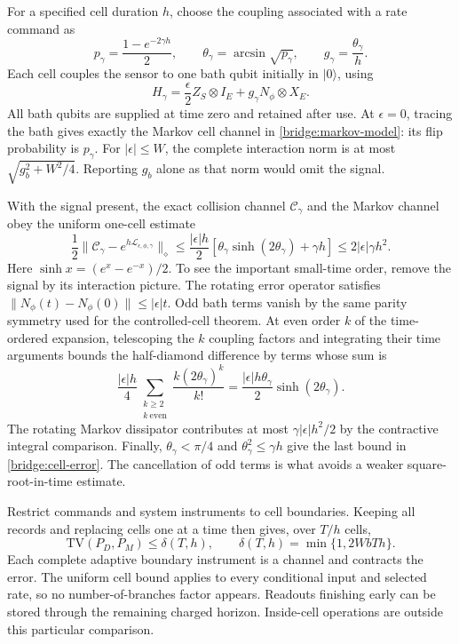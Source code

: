 \documentclass[11pt,a4paper]{article}
\numberwithin{equation}{section}
\theoremstyle{remark}
\begin{document}
For a specified cell duration $h$, choose the coupling associated with a
rate command as
\begin{equation}
 p_\gamma=\frac{1-e^{-2\gamma h}}2,
 \qquad \theta_\gamma=\arcsin\sqrt{p_\gamma},
 \qquad g_\gamma=\frac{\theta_\gamma}{h}.
\end{equation}
Each cell couples the sensor to one bath qubit initially in $|0\rangle$,
using
\begin{equation}
 H_\gamma=\frac\epsilon2 Z_S\otimes I_E+
 g_\gamma N_\phi\otimes X_E.
\end{equation}
All bath qubits are supplied at time zero and retained after use. At
$\epsilon=0$, tracing the bath gives exactly the Markov cell channel in
\eqref{bridge:markov-model}: its flip probability is $p_\gamma$.
For $|\epsilon|\le W$, the complete interaction norm is at most
$\sqrt{g_b^2+W^2/4}$. Reporting $g_b$ alone as that norm would omit the signal.

With the signal present, the exact collision channel $\mathcal C_\gamma$
and the Markov channel obey the uniform one-cell estimate
\begin{equation}
 \frac12\|\mathcal C_\gamma-e^{h\mathcal L_{\epsilon,\phi,\gamma}}
 \|_\diamond
 \le\frac{|\epsilon|h}{2}
 [\theta_\gamma\sinh(2\theta_\gamma)+\gamma h]
 \le 2|\epsilon|\gamma h^2.
 \label{bridge:cell-error}
\end{equation}
Here $\sinh x=(e^x-e^{-x})/2$. To see the important small-time order,
remove the signal by its interaction picture. The rotating error operator
satisfies $\|N_\phi(t)-N_\phi(0)\|\le|\epsilon|t$. Odd bath terms vanish
by the same parity symmetry used for the controlled-cell theorem. At even
order $k$ of the time-ordered expansion, telescoping the $k$ coupling
factors and integrating their
time arguments bounds the half-diamond difference by terms whose sum is
\begin{equation}
 \frac{|\epsilon|h}{4}
 \sum_{\substack{k\ge2\\k\ \mathrm{even}}}
 \frac{k(2\theta_\gamma)^k}{k!}
 =\frac{|\epsilon|h\theta_\gamma}{2}\sinh(2\theta_\gamma).
\end{equation}
The rotating Markov dissipator contributes at most
$\gamma|\epsilon|h^2/2$ by the contractive integral comparison.
Finally, $\theta_\gamma<\pi/4$ and
$\theta_\gamma^2\le\gamma h$ give the last bound in
\eqref{bridge:cell-error}. The cancellation of odd terms is what avoids
a weaker square-root-in-time estimate.

Restrict commands and system instruments to cell boundaries. Keeping all
records and replacing cells one at a time then gives, over $T/h$ cells,
\begin{equation}
 \mathrm{TV}(P_D,P_M)\le\delta(T,h),
 \qquad \delta(T,h)=\min\{1,2WbTh\}.
 \label{bridge:record-error}
\end{equation}
Each complete adaptive boundary instrument is a channel and contracts the
error. The uniform cell bound applies to every conditional input and
selected rate, so no number-of-branches factor appears. Readouts finishing
early can be stored through the remaining charged horizon. Inside-cell
operations are outside this particular comparison.
\end{document}
